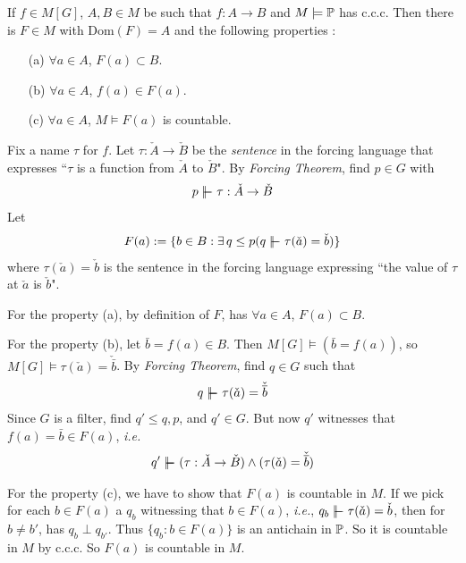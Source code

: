 \documentclass[12pt,a4paper]{article}
\newenvironment{proof}
{\begin{changemargin}{0.5cm}{0.5cm} 
	}%
	{\end{changemargin}
}
\newenvironment{p}
{\begin{proof} 
	}%
	{\end{proof}
}
\begin{document}
\lem If $f\in M[G]$, $A, B\in M$ be such that $f: A\rightarrow B$ and $M\models \mathbb{P}$ has c.c.c. Then there is $F\in M$ with $\text{Dom}(F) = A$ and the following properties :
\begin{itemize}
\item[(a)] $\forall a\in A$, $F(a) \subset B$.
\item[(b)] $\forall a\in A$, $f(a) \in F(a)$. 
\item[(c)] $\forall a\in A$, $M\models F(a)$ is countable.
\end{itemize}
\begin{p}
\pf Fix a name $\tau$ for $f$. Let $\tau : \check{A} \rightarrow \check{B}$ be the \emph{sentence} in the forcing language that expresses ``$\tau$ is a function from $\check{A}$ to $\check{B}$". By \emph{Forcing Theorem}, find $p\in G$ with
\begin{align*}
p\forces \tau : \check{A} \rightarrow \check{B}
\end{align*}
Let
\begin{align*}
F(a) := \{b\in B : \exists \, q\leq p (q\forces \tau(\check{a}) = \check{b} ) \}
\end{align*}  
where $\tau(\check{a}) = \check{b}$ is the sentence in the forcing language expressing ``the value of $\tau$ at $\check{a}$ is $\check{b}$".

\quad For the property (a), by definition of $F$, has $\forall a\in A$, $F(a) \subset B$.

\quad For the property (b), let $\bar{b} = f(a) \in B$. Then $M[G] \models (\bar{b} = f(a))$, so $M[G]\models \tau(\check{a}) = \check{\bar{b}}$. By \emph{Forcing Theorem}, find $q\in G$ such that
\begin{align*}
q\forces \tau(\check{a}) = \check{\bar{b}}
\end{align*} 
Since $G$ is a filter, find $q' \leq q, p$, and $q'\in G$. But now $q'$ witnesses that $f(a) = \bar{b} \in F(a)$, \textit{i.e.}
\begin{align*}
q' \forces (\tau : \check{A} \rightarrow \check{B}) \wedge (\tau(\check{a}) = \check{\bar{b}})
\end{align*}

\quad For the property (c), we have to show that $F(a)$ is countable in $M$. If we pick for each $b\in F(a)$ a $q_b$ witnessing that $b\in F(a)$, \textit{i.e.}, $q_b \forces \tau(\check{a}) = \check{b}$, then for $b\neq b'$, has $q_b \perp q_{b'}$. Thus $\{q_b : b\in F(a)\}$ is an antichain in $\mathbb{P}$. So it is countable in $M$ by c.c.c. So $F(a)$ is countable in $M$.

\eop
\end{p}
\s
\end{document}
